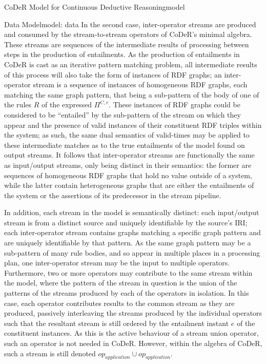 \begin{nestedsection}{CoDeR Model for Continuous Deductive Reasoning}{model}
\begin{nestedsection}{Data Model}{model: data}
		In the second case, inter-operator streams are produced and consumed by the stream-to-stream operators of CoDeR's minimal algebra.
		These streams are sequences of the intermediate results of processing between steps in the production of entailments.
		As the production of entailments in CoDeR is cast as an iterative pattern matching problem, all intermediate results of this process will also take the form of instances of RDF graphs;
		an inter-operator stream is a sequence of instances of homogeneous RDF graphs, each matching the same graph pattern, that being a sub-pattern of the body of one of the rules $R$ of the expressed $\Pi^{C,r}$.
		These instances of RDF graphs could be considered to be ``entailed'' by the sub-pattern of the stream on which they appear and the presence of valid instances of their constituent RDF triples within the system;
		as such, the same dual semantics of valid-times may be applied to these intermediate matches as to the true entailments of the model found on output streams.
		It follows that inter-operator streams are functionally the same as input/output streams, only being distinct in their semantics:
		the former are sequences of homogeneous RDF graphs that hold no value outside of a system, while the latter contain heterogeneous graphs that are either the entailments of the system or the assertions of its predecessor in the stream pipeline.

		In addition, each stream in the model is semantically distinct:
		each input/output stream is from a distinct source and uniquely identifiable by the source's IRI;
		each inter-operator stream contains graphs matching a specific graph pattern and are uniquely identifiable by that pattern.
		As the same graph pattern may be a sub-pattern of many rule bodies, and so appear in multiple places in a processing plan, one inter-operator stream may be the input to multiple operators.
		Furthermore, two or more operators may contribute to the same stream within the model, where the pattern of the stream in question is the union of the patterns of the streams produced by each of the operators in isolation.
		In this case, each operator contributes results to the common stream as they are produced, passively interleaving the streams produced by the individual operators such that the resultant stream is still ordered by the entailment instant $e$ of the constituent instances.
		As this is the active behaviour of a stream union operator, such an operator is not needed in CoDeR.
		However, within the algebra of CoDeR, such a stream is still denoted ${op_{application} \cup op_{application}}$.
	\end{nestedsection}


\end{nestedsection}
